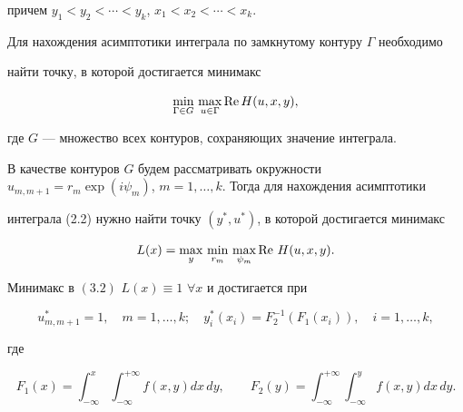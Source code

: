 причем $y_1<y_2<\dotsb<y_k$, $x_1<x_2<\dotsb<x_k$.





Для нахождения асимптотики интеграла по замкнутому контуру $\Gamma$ необходимо


найти точку, в которой достигается минимакс


\begin{equation}


\min_{\Gamma \in G} \, \max_{u \in \Gamma} \re H(u,x,y),


\end{equation}


где $G$ --- множество всех контуров, сохраняющих значение интеграла.


В качестве контуров $G$ будем рассматривать окружности $u_{m,m+1}


=r_m\exp({i\psi_m})$, $m=1,\dotsc,k$. Тогда для нахождения асимптотики


интеграла (2.2) нужно найти точку $(y^*,u^*)$, в которой достигается минимакс


\begin{equation}


L(x)= \max_{y}\, \min_{r_m} \, \max_{\psi_m}


\re\, H(u,x,y).


\end{equation}





\begin{thm}


Минимакс в $(3.2)$ $L(x) \equiv 1$ $\forall x$ и достигается при 


$$


u_{m,m+1}^*=1, \quad m=1,\dotsc ,k; \quad


y_i^*(x_i)=F_2^{-1}(F_1(x_i)), \quad i=1,\dotsc ,k,


$$


где


$$


F_1(x)=\int_{-\infty}^x


\int_{-\infty}^{+\infty}f(x,y)dx\,dy,


\qquad


F_2(y)=\int_{-\infty}^{+\infty}


\int_{-\infty}^yf(x,y)dx\,dy.


$$


\end{thm}





